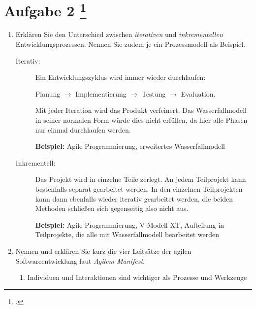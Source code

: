 \documentclass{lehramt-informatik-aufgabe}
\begin{document}
\section{Aufgabe 2
\footcite{66116:2021:03}}

\begin{enumerate}


\item Erklären Sie den Unterschied zwischen \emph{iterativen} und
\emph{inkrementellen} Entwicklungsprozessen. Nennen Sie zudem je ein
Prozessmodell als Beispiel.

\begin{liAntwort}
\begin{description}
\item[Iterativ:]

Ein Entwicklungszyklus wird immer wieder durchlaufen:

Planung $\rightarrow$ Implementierung $\rightarrow$ Testung
$\rightarrow$ Evaluation.

Mit jeder Iteration wird das Produkt verfeinert. Das Wasserfallmodell in
seiner normalen Form würde dies nicht erfüllen, da hier alle Phasen nur
einmal durchlaufen werden.

\textbf{Beispiel:} Agile Programmierung, erweitertes Wasserfallmodell

\item[Inkrementell:]

Das Projekt wird in einzelne Teile zerlegt. An jedem Teilprojekt kann
bestenfalls separat gearbeitet werden. In den einzelnen Teilprojekten
kann dann ebenfalls wieder iterativ gearbeitet werden, die beiden
Methoden schließen sich gegenseitig also nicht aus.

\textbf{Beispiel:} Agile Programmierung, V-Modell XT, Aufteilung in
Teilprojekte, die alle mit Wasserfallmodell bearbeitet werden
\end{description}
\end{liAntwort}


\item Nennen und erklären Sie kurz die vier Leitsätze der agilen
Softwareentwicklung laut \emph{Agilem Manifest}.

\begin{liAntwort}
\begin{enumerate}
\item Individuen und Interaktionen sind wichtiger als Prozesse und
Werkzeuge


\end{enumerate}
\end{liAntwort}
\end{enumerate}
\end{document}
